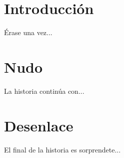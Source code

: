 \documentclass[a4paper,openright,12pt]{book}
\begin{document}
\tableofcontents

\chapter{Introducción}
Érase una vez...

\chapter{Nudo}\label{cap.nudo}
La historia continúa con...

\chapter{Desenlace}\label{cap.desenlace}
El final de la historia es sorprendete...
\end{document}
